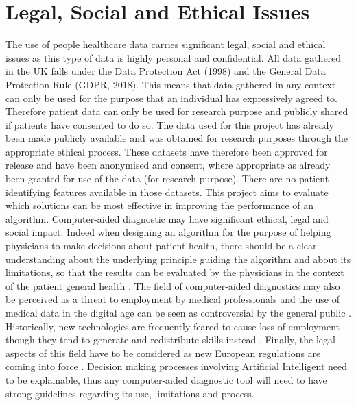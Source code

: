 \section{Legal, Social and Ethical Issues}
The use of people healthcare data carries significant legal, social and ethical issues as this type of data is highly personal and confidential.\newline
All data gathered in the UK falls under the Data Protection Act (1998) and the General Data Protection Rule (GDPR, 2018). This means that data gathered in any context can only be used for the purpose that an individual has expressively agreed to. Therefore patient data can only be used for research purpose and publicly shared if patients have consented to do so.\newline
The data used for this project has already been made publicly available and was obtained for research purposes through the appropriate ethical process. These datasets have therefore been approved for release and have been anonymised and consent, where appropriate as already been granted for use of the data (for research purpose).\newline
There are no patient identifying features available in those datasets.\newline
This project aims to evaluate which solutions can be most effective in improving the performance of an algorithm. Computer-aided diagnostic may have significant ethical, legal and social impact. Indeed when designing an algorithm for the purpose of helping physicians to make decisions about patient health, there should be a clear understanding about the underlying principle guiding the algorithm and about its limitations, so that the results can be evaluated by the physicians in the context of the patient general health \citep{Ahmad:2018fz}.\newline
The field of computer-aided diagnostics may also be perceived as a threat to employment by medical professionals \citep{Pesapane:2018kv, Cabitza:2017hv} and the use of medical data in the digital age can be seen as controversial by the general public \citep{Goldacre:tf}. Historically, new technologies are frequently feared to cause loss of employment though they tend to generate and redistribute skills instead \citep{Allen:2015ww}.\newline
Finally, the legal aspects of this field have to be considered as new European regulations are coming into force \citep{Parliament:TIo8Z78P}. Decision making processes involving Artificial Intelligent need to be explainable, thus any computer-aided diagnostic tool will  need to have strong guidelines regarding its use, limitations and process.\newline

